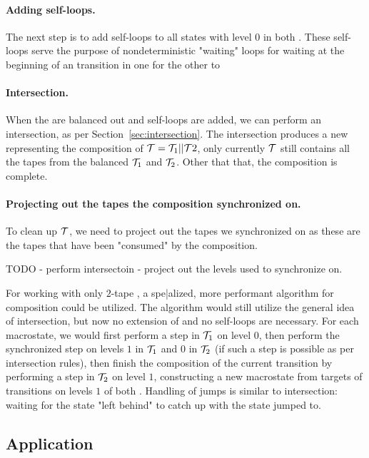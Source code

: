 \paragraph{Adding self-loops.}
The next step is to add self-loops to all states with level $0$ in both \nfts.
These self-loops serve the purpose of nondeterministic "waiting" loops for waiting at the beginning of an \nft transition in one \nft for the other \nft to

\paragraph{Intersection.}
When the \nfts are balanced out and self-loops are added, we can perform an \nft intersection, as per Section~\ref{sec:intersection}.
The intersection produces a new \nft representing the composition of $\mathcal{T} = \mathcal{T}_1 || \mathcal{T}2$, only currently $\mathcal{T}$ still contains all the tapes from the balanced $\mathcal{T}_1$ and $\mathcal{T}_2$.
Other that that, the composition is complete.

\paragraph{Projecting out the tapes the composition synchronized on.}
To clean up $\mathcal{T}$, we need to project out the tapes we synchronized on as these are the tapes that have been "consumed" by the composition.

TODO
- perform intersectoin
- project out the levels used to synchronize on.

For working with only $2$-tape \nfts, a spe|alized, more performant algorithm for composition could be utilized.
The algorithm would still utilize the general idea of \nft intersection, but now no extension of \nfts and no self-loops are necessary.
For each macrostate, we would first perform a step in $\mathcal{T}_1$ on level $0$, then perform the synchronized step on levels $1$ in $\mathcal{T}_1$ and $0$ in $\mathcal{T}_2$ (if such a step is possible as per \nft intersection rules), then finish the composition of the current transition by performing a step in $\mathcal{T}_2$ on level $1$, constructing a new macrostate from targets of transitions on levels $1$ of both \nfts.
Handling of jumps is similar to \nft intersection: waiting for the state "left behind" to catch up with the state jumped to.

\subsection{Application}

